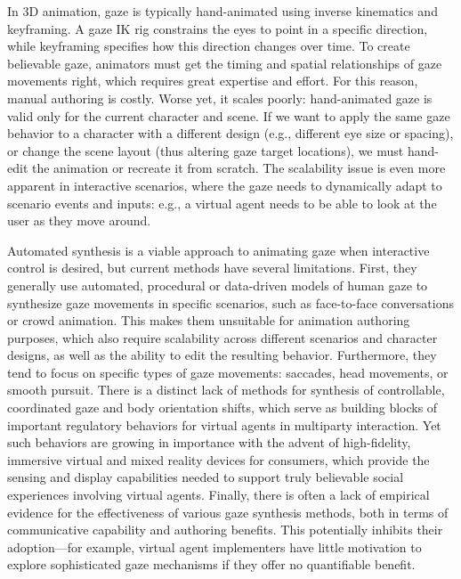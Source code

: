 In 3D animation, gaze is typically hand-animated using inverse kinematics and keyframing. A gaze IK rig constrains the eyes to point in a specific direction, while keyframing specifies how this direction changes over time. To create believable gaze, animators must get the timing and spatial relationships of gaze movements right, which requires great expertise and effort. For this reason, manual authoring is costly. Worse yet, it scales poorly: hand-animated gaze is valid only for the current character and scene. If we want to apply the same gaze behavior to a character with a different design (e.g., different eye size or spacing), or change the scene layout (thus altering gaze target locations), we must hand-edit the animation or recreate it from scratch. The scalability issue is even more apparent in interactive scenarios, where the gaze needs to dynamically adapt to scenario events and inputs: e.g., a virtual agent needs to be able to look at the user as they move around.

Automated synthesis is a viable approach to animating gaze when interactive control is desired, but current methods have several limitations. First, they generally use automated, procedural or data-driven models of human gaze to synthesize gaze movements in specific scenarios, such as face-to-face conversations or crowd animation. This makes them unsuitable for animation authoring purposes, which also require scalability across different scenarios and character designs, as well as the ability to edit the resulting behavior. Furthermore, they tend to focus on specific types of gaze movements: saccades, head movements, or smooth pursuit. There is a distinct lack of methods for synthesis of controllable, coordinated gaze and body orientation shifts, which serve as building blocks of important regulatory behaviors for virtual agents in multiparty interaction. Yet such behaviors are growing in importance with the advent of high-fidelity, immersive virtual and mixed reality devices for consumers, which provide the sensing and display capabilities needed to support truly believable social experiences involving virtual agents. Finally, there is often a lack of empirical evidence for the effectiveness of various gaze synthesis methods, both in terms of communicative capability and authoring benefits. This potentially inhibits their adoption---for example, virtual agent implementers have little motivation to explore sophisticated gaze mechanisms if they offer no quantifiable benefit.

